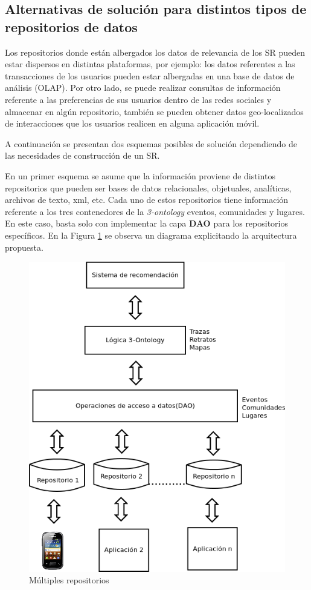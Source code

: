 \subsection{Alternativas de solución para distintos tipos de repositorios de datos}

Los repositorios donde están albergados los datos de relevancia de los SR pueden estar dispersos en distintas plataformas, por ejemplo: los datos referentes a las transacciones de los usuarios pueden estar albergadas en una base de datos de análisis (OLAP). Por otro lado, se puede realizar consultas de información referente a las preferencias de sus usuarios dentro de las redes sociales y almacenar en algún repositorio, también se pueden obtener datos geo-localizados de interacciones que los usuarios realicen en alguna aplicación móvil.

A continuación se presentan dos esquemas posibles de solución dependiendo de las necesidades de construcción de un SR.

En un primer esquema se asume que la información proviene de distintos repositorios que pueden ser bases de datos relacionales, objetuales, analíticas, archivos de texto, xml, etc. Cada uno de estos repositorios tiene información referente a los tres contenedores de la \textit{3-ontology} eventos, comunidades y lugares. En este caso, basta solo con implementar la capa \textbf{DAO} para los repositorios específicos.  En la Figura \ref{fig:multiplesrepositorios} se observa un diagrama explicitando la arquitectura propuesta. 

\begin{figure}[tp]
	\centering
	\includegraphics[scale=.6]{images/3-ontology-multiples-repos.png}
	\caption{Múltiples repositorios}
	\label{fig:multiplesrepositorios}
\end{figure}

